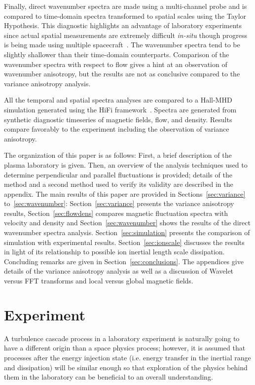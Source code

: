 \documentclass[aip,prl,amsmath,amssymb,reprint,superscriptaddress]{revtex4-1} %
\begin{document}
Finally, direct wavenumber spectra are made using a multi-channel probe and is compared to time-domain spectra transformed to spatial scales using the Taylor Hypothesis. This diagnostic highlights an advantage of laboratory experiments since actual spatial measurements are extremely difficult {\it in-situ} though progress is being made using multiple spacecraft~\cite{sahraoui06,sahraoui10}.  The wavenumber spectra tend to be slightly shallower than their time-domain counterparts. Comparison of the wavenumber spectra with respect to flow gives a hint at an observation of wavenumber anisotropy, but the results are not as conclusive compared to the variance anisotropy analysis.

All the temporal and spatial spectra analyses are compared to a Hall-MHD simulation generated using the HiFi framework~\cite{schaffner14a}. Spectra are generated from synthetic diagnostic timeseries of magnetic fields, flow, and density. Results compare favorably to the experiment including the observation of variance anisotropy.

The organization of this paper is as follows: First, a brief description of the plasma laboratory is given. Then, an overview of the analysis techniques used to determine perpendicular and parallel fluctuations is provided; details of the method and a second method used to verify its validity are described in the appendix. The main results of this paper are provided in Sections~\ref{sec:variance} to~\ref{sec:wavenumber}: Section~\ref{sec:variance} presents the variance anisotropy results, Section~\ref{sec:flowdens} compares magnetic fluctuation spectra with velocity and density and Section~\ref{sec:wavenumber} shows the results of the direct wavenumber spectra analysis. Section~\ref{sec:simulation} presents the comparison of simulation with experimental results. Section~\ref{sec:ionscale} discusses the results in light of its relationship to possible ion inertial length scale dissipation. Concluding remarks are given in Section~\ref{sec:conclusions}. The appendices give details of the variance anisotropy analysis as well as a discussion of Wavelet versus FFT transforms and local versus global magnetic fields.

\section{Experiment}\label{sec:experiment}

A turbulence cascade process in a laboratory experiment is naturally going to have a different origin than a space physics process; however, it is assumed that processes after the energy injection state (i.e. energy transfer in the inertial range and dissipation) will be similar enough so that exploration of the physics behind them in the laboratory can be beneficial to an overall understanding.
\end{document}
